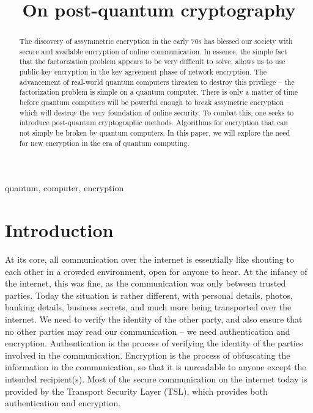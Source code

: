 \documentclass[conference]{IEEEtran}
\begin{document}
\title{On post-quantum cryptography}

\author{
}

\maketitle

\begin{abstract}
  The discovery of assymmetric encryption in the early 70s has blessed our society with secure and available encryption of online communication.
  In essence, the simple fact that the factorization problem appears to be very difficult to solve, allows us to use public-key encryption in the key agreement phase of network encryption.
  The advancement of real-world quantum computers threaten to destroy this privilege -- the factorization problem is simple on a quantum computer.
  There is only a matter of time before quantum computers will be powerful enough to break assymetric encryption -- which will destroy the very foundation of online security.
  To combat this, one seeks to introduce post-quantum cryptographic methods.
  Algorithms for encryption that can not simply be broken by quantum computers.
  In this paper, we will explore the need for new encryption in the era of quantum computing.
\end{abstract}

\begin{IEEEkeywords}
quantum, computer, encryption
\end{IEEEkeywords}

\section{Introduction}
At its core, all communication over the internet is essentially like shouting to each other in a crowded environment, open for anyone to hear.
At the infancy of the internet, this was fine, as the communication was only between trusted parties.
Today the situation is rather different, with personal details, photos, banking details, business secrets, and much more being transported over the internet.
We need to verify the identity of the other party, and also ensure that no other parties may read our communication -- we need authentication and encryption.
Authentication is the process of verifying the identity of the parties involved in the communication.
Encryption is the process of obfuscating the information in the communication, so that it is unreadable to anyone except the intended recipient(s).
Most of the secure communication on the internet today is provided by the Transport Security Layer (TSL), which provides both authentication and encryption.
\end{document}
